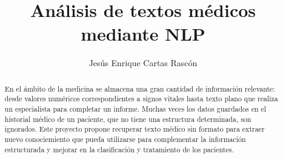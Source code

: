 \documentclass[12pt, a4paper, twoside]{report}
\title{Análisis de textos médicos \\mediante NLP}
\author{Jesús Enrique Cartas Rascón}
\begin{document}


\begin{abstract}
  En el ámbito de la medicina se almacena una gran cantidad de información relevante: desde valores numéricos correspondientes a signos vitales hasta texto plano que realiza un especialista para completar un informe. Muchas veces los datos guardados en el historial médico de un paciente, que no tiene una estructura determinada, son ignorados. Este proyecto propone recuperar texto médico sin formato para extraer nuevo conociemiento que pueda utilizarse para complementar la información estructurada y mejorar en la clasificación y tratamiento de los pacientes.
\end{abstract}


\tableofcontents












% 



\end{document}
